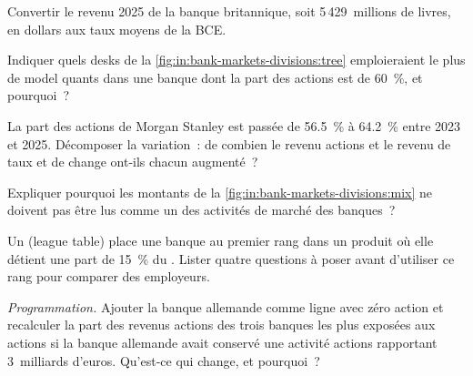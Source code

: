 \begin{exercise}[$\star$]\label{exo:in:bank-markets-divisions:2}
Convertir le revenu  2025 de la banque britannique, soit 5\,429~millions de livres, en dollars aux taux moyens de la BCE.
\end{exercise}

\begin{exercise}[$\star$]\label{exo:in:bank-markets-divisions:3}
Indiquer quels desks de la \cref{fig:in:bank-markets-divisions:tree} emploieraient le plus de model quants dans une banque
dont la part des actions est de 60~\%, et pourquoi~?
\end{exercise}

\begin{exercise}[$\star\star$]\label{exo:in:bank-markets-divisions:4}
La part des actions de Morgan Stanley est passée de 56.5~\% à 64.2~\% entre 2023 et 2025. Décomposer la variation~: de combien
le revenu actions et le revenu de taux et de change ont-ils chacun augmenté~?
\end{exercise}

\begin{exercise}[$\star\star$]\label{exo:in:bank-markets-divisions:5}
Expliquer pourquoi les montants de la \cref{fig:in:bank-markets-divisions:mix} ne doivent pas être lus comme un  des activités
de marché des banques~?
\end{exercise}

\begin{exercise}[$\star\star$]\label{exo:in:bank-markets-divisions:6}
Un  (league table) place une banque au premier rang dans un produit où elle détient une part de 15~\% du . Lister quatre questions à poser avant
d'utiliser ce rang pour comparer des employeurs.
\end{exercise}

\begin{exercise}[$\star\star\star$]\label{exo:in:bank-markets-divisions:7}
\emph{Programmation.} Ajouter la banque allemande comme ligne avec zéro action et recalculer la part des revenus actions des trois banques les plus exposées aux actions si la banque allemande
avait conservé une activité actions rapportant 3~milliards d'euros. Qu'est-ce qui change, et pourquoi~?
\end{exercise}

